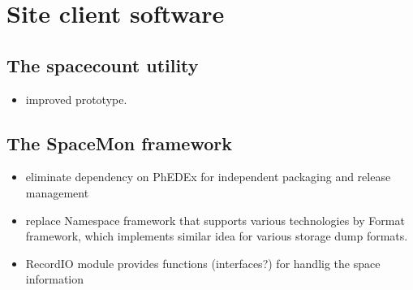 \section {Site client software}
\subsection {The spacecount utility}
\begin{itemize}
\item improved prototype. 
\end{itemize} 
\subsection {The SpaceMon framework }

\begin{itemize}
\item eliminate dependency on PhEDEx for independent packaging and release management 
\item replace Namespace framework that supports various technologies by Format framework, which implements similar idea for various storage dump formats. 
\item RecordIO module provides functions (interfaces?) for handlig the space information 
\end{itemize}